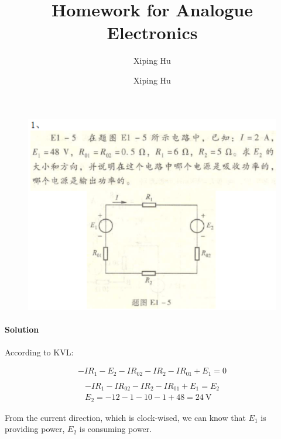 \documentclass{article}
\author{Xiping Hu}
\author{Xiping Hu}
\affil{http://thehxp.tech/}
\title{Homework for Analogue Electronics}
\begin{document}
\maketitle

\begin{figure}[H]
  \centering
  \includegraphics[width=\linewidth]{figures/1}
  \label{fig:}
\end{figure}

\paragraph{Solution}

According to KVL:

\begin{equation*}
  \begin{aligned}
    - I R_1 - E_2 - I R_{02} - I R_2 - I R_{01} + E_1 = 0 \\   
  \end{aligned}
\end{equation*}
\begin{equation*}
  \begin{aligned}
    - I R_1 - I R_{02} - I R_2 - I R_{01} + E_1 = E_2\\
    E_2 = - 12 - 1 - 10 - 1 + 48 = 24 \  \mathrm{V}
  \end{aligned}
\end{equation*}

From the current direction, which is clock-wised, we can know that $E_1$ is providing power, $E_2$ is consuming power.
\end{document}
